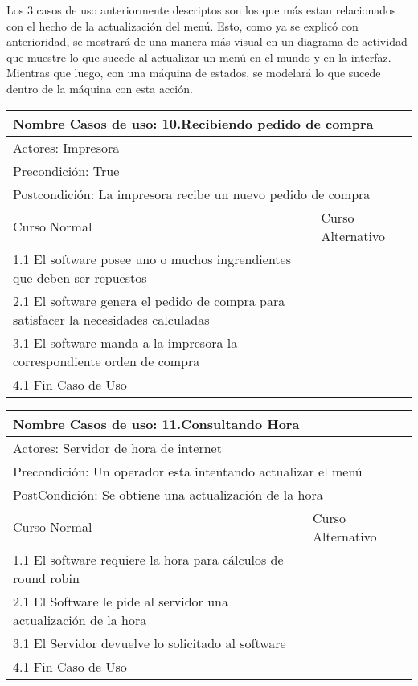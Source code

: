 \documentclass[a4paper,10pt]{article}
\begin{document}
\bigskip

Los 3 casos de uso anteriormente descriptos son los que m\'as estan relacionados con el hecho de la actualizaci\'on del men\'u. Esto, como ya se
explic\'o con anterioridad, se mostrar\'a de una manera m\'as visual en un diagrama de actividad que muestre lo que sucede al actualizar un men\'u
en el mundo y en la interfaz. Mientras que luego, con una m\'aquina de estados, se modelar\'a lo que sucede dentro de la m\'aquina con esta acci\'on.

\bigskip

\begin{center}
\begin{tabularx}{14cm}{|X|X|}
\hline
\multicolumn{2}{|l|}{Nombre Casos de uso: 10.Recibiendo pedido de compra}\\
\hline
\multicolumn{2}{|l|}{Actores: Impresora}\\
\hline
\multicolumn{2}{|l|}{Precondici\'on: True}\\
\hline
\multicolumn{2}{|l|}{Postcondici\'on: La impresora recibe un nuevo pedido de compra}\\
\hline
Curso Normal & Curso Alternativo\\
\hline
1.1 El software posee uno o muchos ingrendientes que deben ser repuestos & 
\\
\hline
2.1 El software genera el pedido de compra para satisfacer la necesidades calculadas & 
\\
\hline
3.1 El software manda a la impresora la correspondiente orden de compra &
\\
\hline
4.1 Fin Caso de Uso &
\\
\hline
\end{tabularx}
\end{center}

\bigskip

\begin{center}
\begin{tabularx}{14cm}{|X|X|}
\hline
\multicolumn{2}{|l|}{Nombre Casos de uso: 11.Consultando Hora}\\
\hline
\multicolumn{2}{|l|}{Actores: Servidor de hora de internet}\\
\hline
\multicolumn{2}{|l|}{Precondici\'on: Un operador esta intentando actualizar el men\'u}\\
\hline
\multicolumn{2}{|l|}{PostCondici\'on: Se obtiene una actualizaci\'on de la hora}\\
\hline
Curso Normal & Curso Alternativo\\
\hline
1.1 El software requiere la hora para cálculos de round robin & 
\\
\hline
2.1 El Software le pide al servidor una actualizaci\'on de la hora & 
\\
\hline
3.1 El Servidor devuelve lo solicitado al software &
\\
\hline
4.1 Fin Caso de Uso &
\\
\hline
\end{tabularx}
\end{center}
\end{document}
